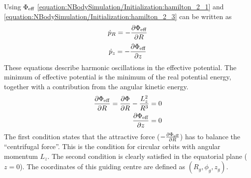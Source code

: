 \documentclass[letterpaper,10pt,english]{sphinxmanual}
\begin{document}
					\sphinxAtStartPar
					Using \(\Phi_{\textup{eff}}\) \eqref{equation:NBodySimulation/Initialization:hamilton_2_1} and \eqref{equation:NBodySimulation/Initialization:hamilton_2_3} can be written as
					\begin{equation}\label{equation:NBodySimulation/Initialization:hamilton_eff_1}
					\begin{split}\dot{p}_{R} = -\frac{\partial \Phi_{\textup{eff}} }{\partial R}\end{split}
					\end{equation}\begin{equation}\label{equation:NBodySimulation/Initialization:hamilton_eff_2}
					\begin{split}\dot{p}_{z} = -\frac{\partial \Phi_{\textup{eff}} }{\partial z}\end{split}
					\end{equation}
					\sphinxAtStartPar
					These equations describe harmonic oscillations in the effective potential.
					The minimum of effective potential is the minimum of the real potential energy, together with a contribution from the angular kinetic energy.
					\begin{equation*}
					\begin{split}\frac{\partial \Phi_{\textup{eff}} }{\partial R} = \frac{\partial \Phi }{\partial R} - \frac{L_z^2}{R^3} =0 \\
					\frac{\partial \Phi_{\textup{eff}} }{\partial z} = 0\end{split}
					\end{equation*}
					\sphinxAtStartPar
					The first condition states that the attractive force (\(-\frac{\partial \Phi_{\textup{eff}} }{\partial R}\)) has to balance the “centrifugal force”.
					This is the condition for circular orbits with angular momentum \(L_z\).
					The second condition is clearly satisfied in the equatorial plane (\(z=0\)).
					The coordinates of this guiding centre are defined as \((R_g,\phi_g,z_g)\).
					
\end{document}
